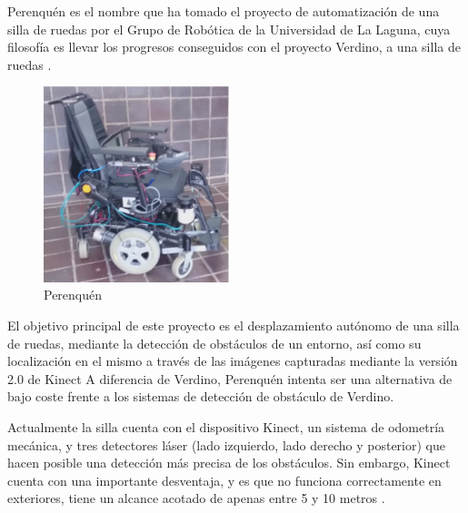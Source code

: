 
Perenquén es el nombre que ha tomado el proyecto de automatización de una silla
de ruedas por el Grupo de Robótica de la Universidad de La Laguna, cuya
filosofía es llevar los progresos conseguidos con el proyecto Verdino, a una
silla de ruedas \cite{ProjectPerenquen}.

\begin{figure}
  \vspace{-20pt}
  \begin{center}
    \includegraphics[width=0.48\textwidth]{images/cap3/Perenquen.eps}
  \end{center}
  \vspace{-20pt}
  \caption{Perenquén}
  \vspace{-10pt}
  \label{fig:Perenquen}
\end{figure}

El objetivo principal de este proyecto es el desplazamiento autónomo de una
silla de ruedas, mediante la detección de obstáculos de un entorno, así como su
localización en el mismo a través de las imágenes capturadas mediante la versión
2.0 de Kinect A diferencia de Verdino, Perenquén intenta ser una alternativa de
bajo coste frente a los sistemas de detección de obstáculo de Verdino.

Actualmente la silla cuenta con el dispositivo Kinect, un sistema de odometría
mecánica, y tres detectores láser (lado izquierdo, lado derecho y posterior) que
hacen posible una detección más precisa de los obstáculos. Sin embargo, Kinect
cuenta con una importante desventaja, y es que no funciona correctamente en
exteriores, tiene un alcance acotado de apenas entre 5 y 10 metros
\cite{PerenquenNoticia}.

